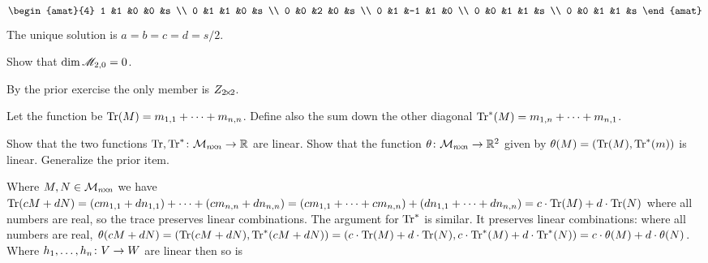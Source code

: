 \begin{exercises}
\begin{answer}
\begin{equation*}
        \begin{amat}{4}
          1  &1  &0  &0  &s  \\
          0  &1  &1  &0  &s  \\          
          0  &0  &2  &0  &s  \\
          0  &1  &-1 &1  &0  \\
          0  &0  &1  &1  &s  \\
          0  &0  &1  &1  &s  
        \end{amat}
      \end{equation*}
      The unique solution is $a=b=c=d=s/2$.
    \end{answer}
  \item \label{exer:DimTwoMagicSqsMagicSumZero} 
    Show that $\dim\mathscr{M}_{2,0}=0$.
    \begin{answer}
       By the prior exercise the only member is $Z_{2 \! \times \! 2}$.
    \end{answer}
  \item   \label{exer:TraceIsLinear}
    Let the  function be 
    $\operatorname{Tr} (M)=m_{1,1}+\cdots+m_{n,n}$.
    Define also
    the sum down the other diagonal
    $\operatorname{Tr}^* (M)=m_{1,n}+\cdots+m_{n,1}$.
    \begin{exparts}
      \partsitem 
        Show that the two functions 
        $\mbox{$\operatorname{Tr},\operatorname{Tr}^*\colon \mathcal{M}_{n \! \times \! n}\to \mathbb{R}$}$
        are linear.
      \partsitem
        Show that the function
       $\mbox{$\theta\colon \mathcal{M}_{n \! \times \! n}\to \mathbb{R}^2$}$
       given by $\theta(M)=(\operatorname{Tr}(M),\operatorname{Tr}^*(m))$
       is linear.
     \partsitem
       Generalize the prior item. 
    \end{exparts}
    \begin{answer}
      \begin{exparts}
        \partsitem
          Where $M,N\in\mathcal{M}_{n \! \times \! n}$ we have 
          $\operatorname{Tr}(cM+dN)=(cm_{1,1}+dn_{1,1})+\cdots+(cm_{n,n}+dn_{n,n})
          =(cm_{1,1}+\cdots+cm_{n,n})+(dn_{1,1}+\cdots+dn_{n,n})
          =c\cdot\operatorname{Tr}(M)+d\cdot\operatorname{Tr}(N)$ where
          all numbers are real, so the trace preserves linear
         combinations.
         The argument for $\operatorname{Tr}^*$ is similar.
       \partsitem
         It preserves linear combinations: where all numbers are real,
          $\theta(cM+dN)=(\operatorname{Tr}(cM+dN),\operatorname{Tr}^*(cM+dN))
          =(c\cdot\operatorname{Tr}(M)+d\cdot\operatorname{Tr}(N), c\cdot\operatorname{Tr}^*(M)+d\cdot\operatorname{Tr}^*(N))
          =c\cdot\theta(M)+d\cdot\theta(N)$.
       \partsitem   
         Where $\mbox{$h_1,\ldots,h_n\colon V\to W$}$ are linear then so is

\end{exparts}
\end{answer}
\end{exercises}
